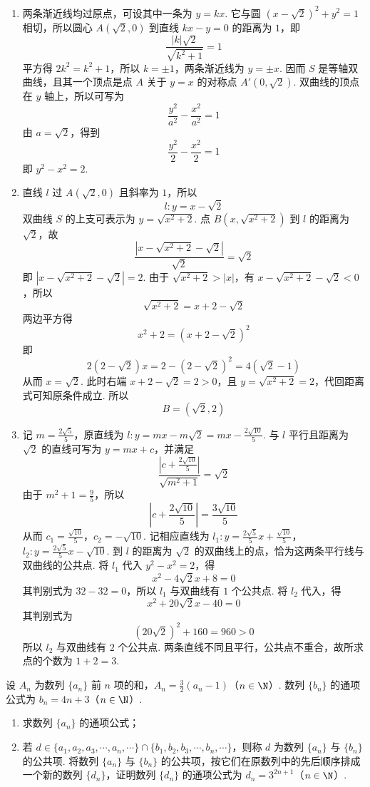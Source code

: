 \documentclass[UTF8,a4paper,oneside,11pt]{ctexbook}
\begin{document}
\begin{solution}
\begin{enumerate}
\item 两条渐近线均过原点，可设其中一条为 \(y=kx\). 它与圆
\(\left(x-\sqrt{2}\right)^2+y^2=1\) 相切，所以圆心 \(A(\sqrt{2},0)\) 到直线 \(kx-y=0\) 的距离为 \(1\)，即
\[
\frac{|k|\sqrt{2}}{\sqrt{k^2+1}}=1
\]
平方得 \(2k^2=k^2+1\)，所以 \(k=\pm1\)，两条渐近线为 \(y=\pm x\). 因而 \(S\) 是等轴双曲线，且其一个顶点是点 \(A\) 关于 \(y=x\) 的对称点 \(A'(0,\sqrt{2})\). 双曲线的顶点在 \(y\) 轴上，所以可写为
\[
\frac{y^2}{a^2}-\frac{x^2}{a^2}=1
\]
由 \(a=\sqrt{2}\)，得到
\[
\frac{y^2}{2}-\frac{x^2}{2}=1
\]
即 \(y^2-x^2=2\).

\item 直线 \(l\) 过 \(A(\sqrt{2},0)\) 且斜率为 \(1\)，所以
\[
l:y=x-\sqrt{2}
\]
双曲线 \(S\) 的上支可表示为 \(y=\sqrt{x^2+2}\). 点 \(B\left(x,\sqrt{x^2+2}\right)\) 到 \(l\) 的距离为 \(\sqrt{2}\)，故
\[
\frac{\left|x-\sqrt{x^2+2}-\sqrt{2}\right|}{\sqrt{2}}=\sqrt{2}
\]
即 \(\left|x-\sqrt{x^2+2}-\sqrt{2}\right|=2\). 由于
\(\sqrt{x^2+2}>|x|\)，有 \(x-\sqrt{x^2+2}-\sqrt{2}<0\)，所以
\[
\sqrt{x^2+2}=x+2-\sqrt{2}
\]
两边平方得
\[
x^2+2=(x+2-\sqrt{2})^2
\]
即
\[
2(2-\sqrt{2})x=2-(2-\sqrt{2})^2=4(\sqrt{2}-1)
\]
从而 \(x=\sqrt{2}\). 此时右端 \(x+2-\sqrt{2}=2>0\)，且
\(y=\sqrt{x^2+2}=2\)，代回距离式可知原条件成立. 所以
\[
B=(\sqrt{2},2)
\]

\item 记 \(m=\frac{2\sqrt{5}}{5}\)，原直线为 \(l:y=mx-m\sqrt{2}=mx-\frac{2\sqrt{10}}{5}\). 与 \(l\) 平行且距离为 \(\sqrt{2}\) 的直线可写为 \(y=mx+c\)，并满足
\[
\frac{\left|c+\frac{2\sqrt{10}}{5}\right|}{\sqrt{m^2+1}}=\sqrt{2}
\]
由于 \(m^2+1=\frac{9}{5}\)，所以
\[
\left|c+\frac{2\sqrt{10}}{5}\right|=\frac{3\sqrt{10}}{5}
\]
从而
\(c_1=\frac{\sqrt{10}}{5}\)，\(c_2=-\sqrt{10}\).
记相应直线为
\(l_1:y=\frac{2\sqrt{5}}{5}x+\frac{\sqrt{10}}{5}\)，\(l_2:y=\frac{2\sqrt{5}}{5}x-\sqrt{10}\).
到 \(l\) 的距离为 \(\sqrt{2}\) 的双曲线上的点，恰为这两条平行线与双曲线的公共点. 将 \(l_1\) 代入 \(y^2-x^2=2\)，得
\[
x^2-4\sqrt{2}x+8=0
\]
其判别式为 \(32-32=0\)，所以 \(l_1\) 与双曲线有 \(1\) 个公共点. 将 \(l_2\) 代入，得
\[
x^2+20\sqrt{2}x-40=0
\]
其判别式为
\[
(20\sqrt{2})^2+160=960>0
\]
所以 \(l_2\) 与双曲线有 \(2\) 个公共点. 两条直线不同且平行，公共点不重合，故所求点的个数为 \(1+2=3\).
\end{enumerate}
\end{solution}

\begin{problem}
设 \(A_n\) 为数列 \(\{a_n\}\) 前 \(n\) 项的和，\(A_n=\frac{3}{2}(a_n-1)\)（\(n\in\N\)）. 数列 \(\{b_n\}\) 的通项公式为 \(b_n=4n+3\)（\(n\in\N\)）.

\begin{enumerate}
\item 求数列 \(\{a_n\}\) 的通项公式；
\item 若 \(d\in\{a_1,a_2,a_3,\cdots,a_n,\cdots\}\cap\{b_1,b_2,b_3,\cdots,b_n,\cdots\}\)，则称 \(d\) 为数列 \(\{a_n\}\) 与 \(\{b_n\}\) 的公共项. 将数列 \(\{a_n\}\) 与 \(\{b_n\}\) 的公共项，按它们在原数列中的先后顺序排成一个新的数列 \(\{d_n\}\)，证明数列 \(\{d_n\}\) 的通项公式为 \(d_n=3^{2n+1}\)（\(n\in\N\)）.
\end{enumerate}
\end{problem}
\end{document}
